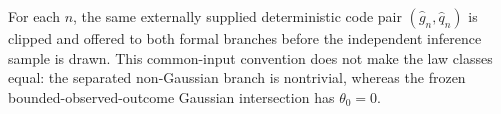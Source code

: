 For each \(n\), the same externally supplied deterministic code pair \((\widehat g_n,\widehat q_n)\) is clipped and offered to both formal branches before the independent inference sample is drawn.  This common-input convention does not make the law classes equal: the separated non-Gaussian branch is nontrivial, whereas the frozen bounded-observed-outcome Gaussian intersection has \(\theta_0=0\).